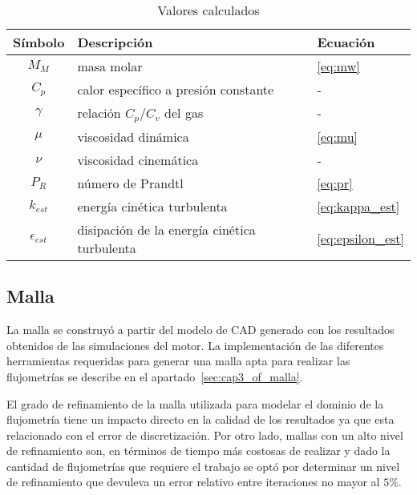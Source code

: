 \begin{table}[h]
  \centering
  \begin{tabular}{cll}\toprule
    Símbolo & Descripción & Ecuación\\ \midrule
    $M_{M}$ & masa molar & \ref{eq:mw} \\
    $C_{p}$ & calor específico a presión constante & - \\
    $\gamma$ & relación $C_{p}/C_{v}$ del gas & - \\
    $\mu$ & viscosidad dinámica & \ref{eq:mu} \\
    $\nu$ & viscosidad cinemática & - \\
    $P_{R}$ & número de Prandtl & \ref{eq:pr} \\
    $k_{est}$ & energía cinética turbulenta & \ref{eq:kappa_est} \\
    $\epsilon_{est}$ & disipación de la energía cinética turbulenta & \ref{eq:epsilon_est} \\ \bottomrule
  \end{tabular}
  \caption{Valores calculados}\label{tab:valores_calculados}
\end{table}



\subsection{Malla}

La malla se construyó a partir del modelo de CAD generado con los resultados
obtenidos de las simulaciones del motor.
%
La implementación de las diferentes herramientas requeridas para generar una
malla apta para realizar las flujometrías se describe en el
apartado~\ref{sec:cap3_of_malla}.

El grado de refinamiento de la malla utilizada para modelar el dominio de la
flujometría tiene un impacto directo en la calidad de los resultados ya que esta
relacionado con el error de discretización.
%
Por otro lado, mallas con un alto nivel de refinamiento son, en términos de
tiempo más costosas de realizar y dado la cantidad de flujometrías que requiere
el trabajo se optó por determinar un nivel de refinamiento que devuleva un error
relativo entre iteraciones no mayor al $5\%$.

